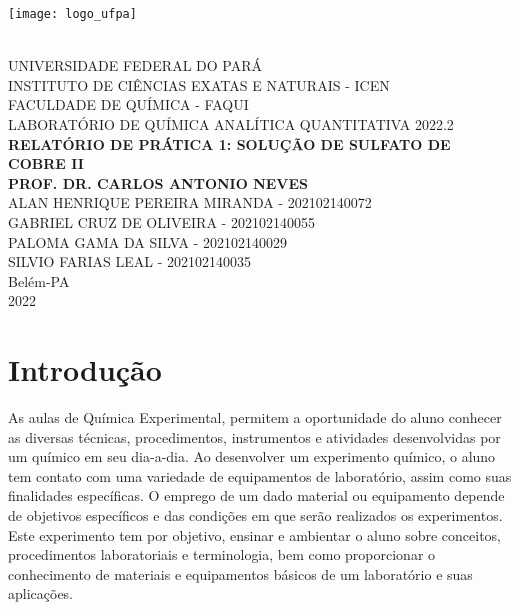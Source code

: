 \documentclass[a4paper, 11pt]{article}
\begin{document}
    \thispagestyle{empty} %

    \begin{center}
        \parbox{3cm}{\texttt{[image: logo\_ufpa]}} \\
        {\vspace {1.0cm}}
        {\Large \uppercase {Universidade Federal do Pará}}\\
        {\Large \uppercase {Instituto de Ciências Exatas e Naturais - ICEN}}\\
        \vspace{3cm}
        {\Large \uppercase {Faculdade de Química - FAQUI}}\\
        {\Large \uppercase {Laboratório de Química Analítica Quantitativa 2022.2} }\\
        \vspace{3cm}
        {\Large \bf \uppercase {Relatório de Prática 1: Solução de Sulfato de Cobre II}}\\
        {\Large \bf \uppercase {Prof. Dr. Carlos Antonio Neves}}\\
        \vspace{3cm}
        {\Large \uppercase {Alan Henrique Pereira Miranda - 202102140072}}\\
        {\Large \uppercase {Gabriel Cruz de Oliveira - 202102140055}}\\
        {\Large \uppercase {Paloma Gama da Silva - 202102140029}}\\
        {\Large \uppercase {Silvio Farias Leal - 202102140035}}\\
        \vspace{0.5cm}
        {\Large  {Belém-PA \\ 2022}}
    \end{center}

    \newpage
    \section{Introdução}\label{sec:introducao}

    \indent As aulas de Química Experimental, permitem a oportunidade do aluno conhecer as diversas técnicas, procedimentos, instrumentos e atividades desenvolvidas por um químico em seu dia-a-dia.
    Ao desenvolver um experimento químico, o aluno tem contato com uma variedade de equipamentos de laboratório, assim como suas finalidades específicas.
    O emprego de um dado material ou equipamento depende de objetivos específicos e das condições em que serão realizados os experimentos.\\
    \indent Este experimento tem por objetivo, ensinar e ambientar o aluno sobre conceitos, procedimentos laboratoriais e terminologia, bem como proporcionar o conhecimento de materiais e equipamentos básicos de um laboratório e suas aplicações.
\end{document}
